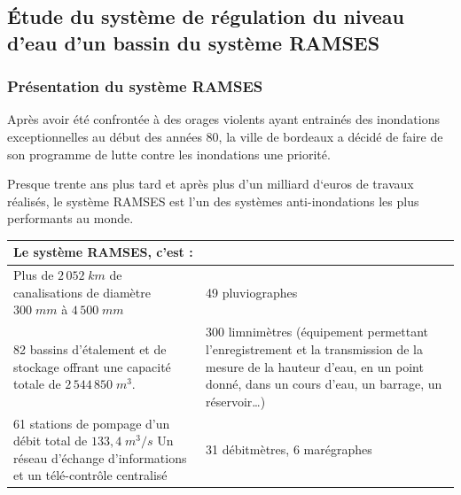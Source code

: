 \documentclass[10pt,fleqn]{article} %
\begin{document}

\vspace{10cm}
\pagestyle{fancy}
\thispagestyle{plain}


\def\columnseprulecolor{\color{ocre}}
\setlength{\columnseprule}{0.4pt} 
\ifprof
\else
\begin{multicols}{2}
\fi

\subsection*{Étude du système de régulation du niveau d'eau d'un bassin du système RAMSES}
\subsubsection*{Présentation du système RAMSES}

Après avoir été confrontée à des orages violents ayant entrainés des inondations exceptionnelles  au début des années 80, la ville de bordeaux a décidé de faire de son programme de lutte contre les inondations une priorité.  

Presque trente ans plus tard et après plus d’un milliard d‘euros de travaux réalisés, le système RAMSES est  l’un des systèmes anti-inondations les plus performants au monde.  

%

\begin{center}
\begin{tabular}{|p{}|p{}|}
\hline
\multicolumn{2}{|l|}{Le système RAMSES, c’est : } \\
\hline
Plus de $2\,052\;km$ de canalisations de diamètre $300 \; mm$ à $4\,500\;mm$ & 49 pluviographes  \\
\hline
82 bassins d’étalement et de stockage offrant une capacité totale de  $2\,544\, 850\;m^3$.
& 
300 limnimètres (équipement permettant l'enregistrement et la transmission de la mesure de la hauteur d'eau, en un point donné, dans un cours d’eau, un barrage, un réservoir…)  \\
 \hline
 61 stations de pompage  d’un débit total de  $133,4 \; m^3/s$ 
 Un réseau d’échange d’informations et un télé-contrôle centralisé &  31 débitmètres, 6 marégraphes \\
 \hline
\end{tabular}
\end{center}


\end{multicols}
\end{document}
